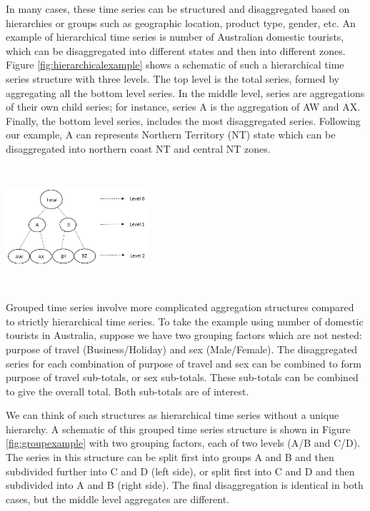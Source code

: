 \documentclass[11pt,a4paper,]{article}
\let\origfigure\figure
\let\endorigfigure\endfigure
\renewenvironment{figure}[1][2] {
    \expandafter\origfigure\expandafter[!htbp]
} {
    \endorigfigure
}
\begin{document}
In many cases, these time series can be structured and disaggregated based on hierarchies or groups such as geographic location, product type, gender, etc. An example of hierarchical time series is number of Australian domestic tourists, which can be disaggregated into different states and then into different zones. Figure \ref{fig:hierarchicalexample} shows a schematic of such a hierarchical time series structure with three levels. The top level is the total series, formed by aggregating all the bottom level series. In the middle level, series are aggregations of their own child series; for instance, series A is the aggregation of AW and AX. Finally, the bottom level series, includes the most disaggregated series. Following our example, A can represents Northern Territory (NT) state which can be disaggregated into northern coast NT and central NT zones.

\begin{figure}

{\centering \includegraphics[width=200px,height=170px,trim=0 0 190 0,clip=true]{Paper-Figures/hierarchical_example} 

}

\caption{An example of a two level hierarchical structure.}\label{fig:hierarchicalexample}
\end{figure}

Grouped time series involve more complicated aggregation structures compared to strictly hierarchical time series. To take the example using number of domestic tourists in Australia, suppose we have two grouping factors which are not nested: purpose of travel (Business/Holiday) and sex (Male/Female). The disaggregated series for each combination of purpose of travel and sex can be combined to form purpose of travel sub-totals, or sex sub-totals. These sub-totals can be combined to give the overall total. Both sub-totals are of interest.

We can think of such structures as hierarchical time series without a unique hierarchy. A schematic of this grouped time series structure is shown in Figure \ref{fig:groupexample} with two grouping factors, each of two levels (A/B and C/D). The series in this structure can be split first into groups A and B and then subdivided further into C and D (left side), or split first into C and D and then subdivided into A and B (right side). The final disaggregation is identical in both cases, but the middle level aggregates are different.
\end{document}
